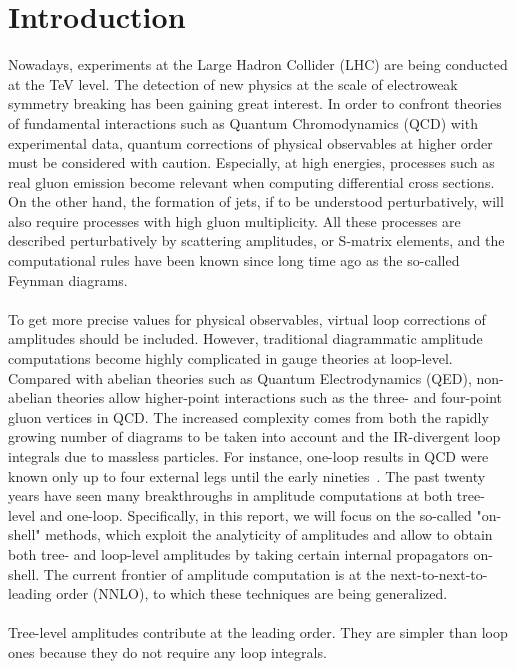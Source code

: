 \section{Introduction}
Nowadays, experiments at the Large Hadron Collider (LHC) are being conducted at the TeV level.
The detection of new physics at the scale of electroweak symmetry breaking has been gaining great interest. 
In order to confront theories of fundamental interactions such as Quantum Chromodynamics (QCD) with experimental data,
quantum corrections of physical observables at higher order must be considered with caution. 
Especially, at high energies, processes such as real gluon emission become relevant when computing differential cross sections. 
On the other hand, the formation of jets, if to be understood perturbatively, will also require processes with high gluon multiplicity.
All these processes are described perturbatively by scattering amplitudes, or S-matrix elements, and the computational rules have been known since long time ago as the so-called Feynman diagrams. 
\\\\
To get more precise values for physical observables, virtual loop corrections of amplitudes should be included.
However, traditional diagrammatic amplitude computations become highly complicated in gauge theories at loop-level.
Compared with abelian theories such as Quantum Electrodynamics (QED), non-abelian theories allow higher-point interactions such as the three- and four-point gluon vertices in QCD.
The increased complexity comes from both the rapidly growing number of diagrams to be taken into account and the IR-divergent loop integrals due to massless particles.  
For instance, one-loop results in QCD were known only up to four external legs until the early nineties~\cite{Bern:1994zx}. 
The past twenty years have seen many breakthroughs in amplitude computations at both tree-level and one-loop.
Specifically, in this report, we will focus on the so-called "on-shell" methods, which exploit the analyticity of amplitudes and allow to obtain both tree- and loop-level amplitudes by taking certain internal propagators on-shell.  
The current frontier of amplitude computation is at the next-to-next-to-leading order (NNLO), to which these techniques are being generalized.
\\\\
Tree-level amplitudes contribute at the leading order. 
They are simpler than loop ones because they do not require any loop integrals.
